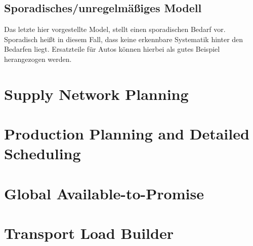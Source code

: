 \subsection{Sporadisches/unregelmäßiges Modell}
Das letzte hier vorgestellte Model, stellt einen sporadischen Bedarf vor. Sporadisch heißt in diesem Fall, dass keine erkennbare Systematik hinter den Bedarfen liegt. Ersatzteile für Autos können hierbei als gutes Beispiel herangezogen werden.

\section{Supply Network Planning}
\section{Production Planning and Detailed Scheduling}
\section{Global Available-to-Promise}
\section{Transport Load Builder}
